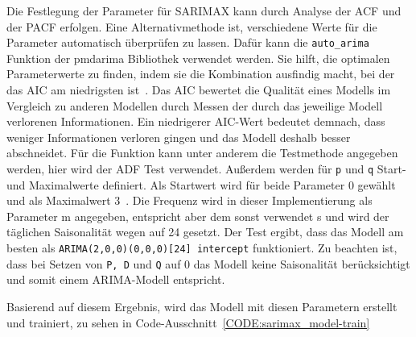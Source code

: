 Die Festlegung der Parameter für SARIMAX kann durch Analyse der \ac{ACF} und der \ac{PACF} erfolgen.
Eine Alternativmethode ist, verschiedene Werte für die Parameter automatisch überprüfen zu lassen.
Dafür kann die \lstinline[columns=fixed]{auto_arima} Funktion der pmdarima Bibliothek verwendet werden.
Sie hilft, die optimalen Parameterwerte zu finden, indem sie die Kombination ausfindig macht, bei der das \ac{AIC} am niedrigsten ist~\cite{Rahmadhan.8.5.2023}.
Das \ac{AIC} bewertet die Qualität eines Modells im Vergleich zu anderen Modellen durch Messen der durch das jeweilige Modell verlorenen Informationen.
Ein niedrigerer \ac{AIC}-Wert bedeutet demnach, dass weniger Informationen verloren gingen und das Modell deshalb besser abschneidet.
Für die Funktion kann unter anderem die Testmethode angegeben werden, hier wird der \ac{ADF} Test verwendet.
Außerdem werden für \lstinline[columns=fixed]{p} und \lstinline[columns=fixed]{q} Start- und Maximalwerte definiert.
Als Startwert wird für beide Parameter 0 gewählt und als Maximalwert 3~\cite{Peixeiro.2022}.
Die Frequenz wird in dieser Implementierung als Parameter m angegeben, entspricht aber dem sonst verwendet s und wird der täglichen Saisonalität wegen auf 24 gesetzt.
Der Test ergibt, dass das Modell am besten als \lstinline[columns=fixed]{ARIMA(2,0,0)(0,0,0)[24] intercept} funktioniert.
Zu beachten ist, dass bei Setzen von \lstinline[columns=fixed]{P, D} und \lstinline[columns=fixed]{Q} auf 0 das Modell keine Saisonalität berücksichtigt und somit einem ARIMA-Modell entspricht.

Basierend auf diesem Ergebnis, wird das Modell mit diesen Parametern erstellt und trainiert, zu sehen in Code-Ausschnitt~\ref{CODE:sarimax_model-train}



